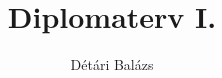 \documentclass[12pt,a4paper,oneside]{report}
\title{Diplomaterv I.}
\author{Détári Balázs}
\begin{document}
\newcommand{\code}[1]{{\fontfamily{qcr}\selectfont{#1}}}


\tableofcontents


%








\end{document}
